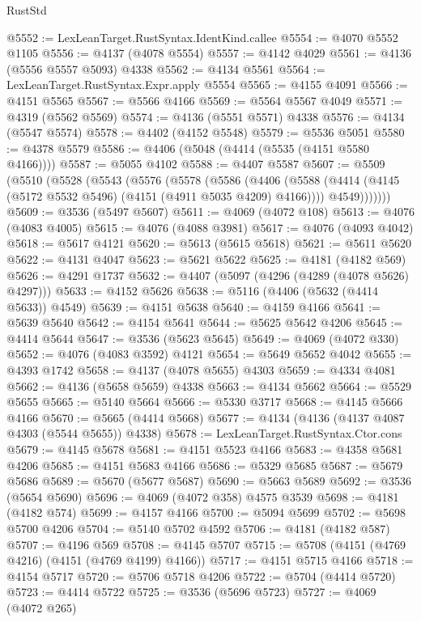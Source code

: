 \begin{lexlean}{RustStd}
\begin{coremodule}
@5552 := LexLeanTarget.RustSyntax.IdentKind.callee
@5554 := @4070 @5552 @1105
@5556 := @4137 (@4078 @5554)
@5557 := @4142 @4029
@5561 := @4136 (@5556 @5557 @5093) @4338
@5562 := @4134 @5561
@5564 := LexLeanTarget.RustSyntax.Expr.apply @5554
@5565 := @4155 @4091
@5566 := @4151 @5565
@5567 := @5566 @4166
@5569 := @5564 @5567 @4049
@5571 := @4319 (@5562 @5569)
@5574 := @4136 (@5551 @5571) @4338
@5576 := @4134 (@5547 @5574)
@5578 := @4402 (@4152 @5548)
@5579 := @5536 @5051
@5580 := @4378 @5579
@5586 := @4406 (@5048 (@4414 (@5535 (@4151 @5580 @4166))))
@5587 := @5055 @4102
@5588 := @4407 @5587
@5607 := @5509
    (@5510
      (@5528
        (@5543
          (@5576
            (@5578
              (@5586
                (@4406
                  (@5588 (@4414 (@4145 (@5172 @5532 @5496) (@4151 (@4911 @5035 @4209) @4166))))
                  @4549)))))))
@5609 := @3536 (@5497 @5607)
@5611 := @4069 (@4072 @108)
@5613 := @4076 (@4083 @4005)
@5615 := @4076 (@4088 @3981)
@5617 := @4076 (@4093 @4042)
@5618 := @5617 @4121
@5620 := @5613 (@5615 @5618)
@5621 := @5611 @5620
@5622 := @4131 @4047
@5623 := @5621 @5622
@5625 := @4181 (@4182 @569)
@5626 := @4291 @1737
@5632 := @4407 (@5097 (@4296 (@4289 (@4078 @5626) @4297)))
@5633 := @4152 @5626
@5638 := @5116 (@4406 (@5632 (@4414 @5633)) @4549)
@5639 := @4151 @5638
@5640 := @4159 @4166
@5641 := @5639 @5640
@5642 := @4154 @5641
@5644 := @5625 @5642 @4206
@5645 := @4414 @5644
@5647 := @3536 (@5623 @5645)
@5649 := @4069 (@4072 @330)
@5652 := @4076 (@4083 @3592) @4121
@5654 := @5649 @5652 @4042
@5655 := @4393 @1742
@5658 := @4137 (@4078 @5655) @4303
@5659 := @4334 @4081
@5662 := @4136 (@5658 @5659) @4338
@5663 := @4134 @5662
@5664 := @5529 @5655
@5665 := @5140 @5664
@5666 := @5330 @3717
@5668 := @4145 @5666 @4166
@5670 := @5665 (@4414 @5668)
@5677 := @4134 (@4136 (@4137 @4087 @4303 (@5544 @5655)) @4338)
@5678 := LexLeanTarget.RustSyntax.Ctor.cons
@5679 := @4145 @5678
@5681 := @4151 @5523 @4166
@5683 := @4358 @5681 @4206
@5685 := @4151 @5683 @4166
@5686 := @5329 @5685
@5687 := @5679 @5686
@5689 := @5670 (@5677 @5687)
@5690 := @5663 @5689
@5692 := @3536 (@5654 @5690)
@5696 := @4069 (@4072 @358) @4575 @3539
@5698 := @4181 (@4182 @574)
@5699 := @4157 @4166
@5700 := @5094 @5699
@5702 := @5698 @5700 @4206
@5704 := @5140 @5702 @4592
@5706 := @4181 (@4182 @587)
@5707 := @4196 @569
@5708 := @4145 @5707
@5715 := @5708 (@4151 (@4769 @4216) (@4151 (@4769 @4199) @4166))
@5717 := @4151 @5715 @4166
@5718 := @4154 @5717
@5720 := @5706 @5718 @4206
@5722 := @5704 (@4414 @5720)
@5723 := @4414 @5722
@5725 := @3536 (@5696 @5723)
@5727 := @4069 (@4072 @265)

\end{coremodule}
\end{lexlean}

